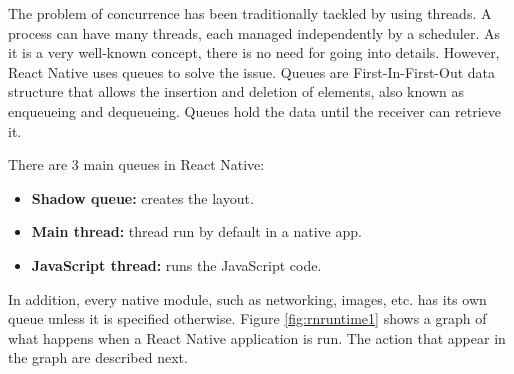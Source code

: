 The problem of concurrence has been traditionally tackled by using threads. A process can have many threads, each managed independently by a scheduler. As it is a very well-known concept, there is no need for going into details. However, React Native uses queues to solve the issue. Queues are First-In-First-Out data structure that allows the insertion and deletion of elements, also known as enqueueing and dequeueing. Queues hold the data until the receiver can retrieve it.

There are 3 main queues in React Native:

\begin{itemize}
 \item \textbf{Shadow queue:} creates the layout.
 \item \textbf{Main thread:} thread run by default in a native app.
 \item \textbf{JavaScript thread:} runs the JavaScript code.
\end{itemize}

In addition, every native module, such as networking, images, etc. has its own queue unless it is specified otherwise. Figure \ref{fig:rnruntime1} shows a graph of what happens when a React Native application is run. The action that appear in the graph are described next.~\cite{runtimeconference}

